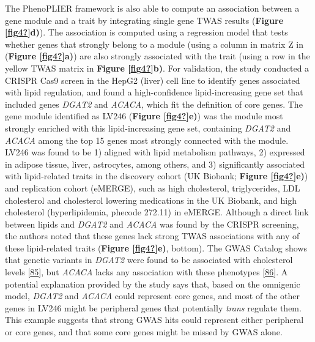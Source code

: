The PhenoPLIER framework is also able to compute an association between a gene module and a trait by integrating single gene TWAS results (\textbf{Figure {[}\protect\hyperlink{ref-fig4}{\textbf{fig4?}}{]}d)}).
The association is computed using a regression model that tests whether genes that strongly belong to a module (using a column in matrix Z in (\textbf{Figure {[}\protect\hyperlink{ref-fig4}{\textbf{fig4?}}{]}a)}) are also strongly associated with the trait (using a row in the yellow TWAS matrix in \textbf{Figure {[}\protect\hyperlink{ref-fig4}{\textbf{fig4?}}{]}b)}.
For validation, the study conducted a CRISPR Cas9 screen in the HepG2 (liver) cell line to identify genes associated with lipid regulation, and found a high-confidence lipid-increasing gene set that included genes \emph{DGAT2} and \emph{ACACA}, which fit the definition of core genes.
The gene module identified as LV246 (\textbf{Figure {[}\protect\hyperlink{ref-fig4}{\textbf{fig4?}}{]}e)}) was the module most strongly enriched with this lipid-increasing gene set, containing \emph{DGAT2} and \emph{ACACA} among the top 15 genes most strongly connected with the module.
LV246 was found to be 1) aligned with lipid metabolism pathways, 2) expressed in adipose tissue, liver, astrocytes, among others, and 3) significantly associated with lipid-related traits in the discovery cohort (UK Biobank; \textbf{Figure {[}\protect\hyperlink{ref-fig4}{\textbf{fig4?}}{]}e)}) and replication cohort (eMERGE), such as high cholesterol, triglycerides, LDL cholesterol and cholesterol lowering medications in the UK Biobank, and high cholesterol (hyperlipidemia, phecode 272.11) in eMERGE.
Although a direct link between lipids and \emph{DGAT2} and \emph{ACACA} was found by the CRISPR screening, the authors noted that these genes lack strong TWAS associations with any of these lipid-related traits (\textbf{Figure {[}\protect\hyperlink{ref-fig4}{\textbf{fig4?}}{]}e)}, bottom).
The GWAS Catalog shows that genetic variants in \emph{DGAT2} were found to be associated with cholesterol levels {[}\protect\hyperlink{ref-xJjWGVyN}{85}{]}, but \emph{ACACA} lacks any association with these phenotypes {[}\protect\hyperlink{ref-1GM0PmkWn}{86}{]}.
A potential explanation provided by the study says that, based on the omnigenic model, \emph{DGAT2} and \emph{ACACA} could represent core genes, and most of the other genes in LV246 might be peripheral genes that potentially \emph{trans} regulate them.
This example suggests that strong GWAS hits could represent either peripheral or core genes, and that some core genes might be missed by GWAS alone.

